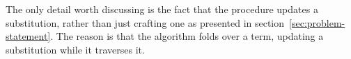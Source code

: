 \documentclass[sigconf,natbib=false,review]{acmart}
\begin{document}


\noindent
The only detail worth discussing is the fact that the procedure updates a
substitution, rather than just crafting one as presented in
section~\ref{sec:problem-statement}. The reason is that the algorithm folds
over a term, updating a substitution while it traverses it.






\end{document}

